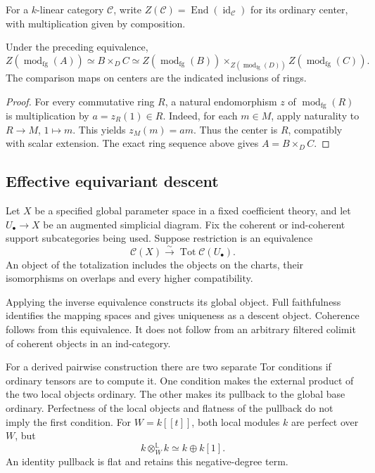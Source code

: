 For a $k$-linear category $\mathcal C$, write
$Z(\mathcal C)=\operatorname{End}(\operatorname{id}_{\mathcal C})$
for its ordinary center, with multiplication given by composition.

\begin{corollary}
\label{v4-arith:ic:w5-h:ordinary-patching-centre}
Under the preceding equivalence,
\[
 Z(\operatorname{mod}_{\mathrm{fg}}(A))
 \simeq B\times_D C
 \simeq Z(\operatorname{mod}_{\mathrm{fg}}(B))
       \times_{Z(\operatorname{mod}_{\mathrm{fg}}(D))}
       Z(\operatorname{mod}_{\mathrm{fg}}(C)).
\]
The comparison maps on centers are the indicated inclusions of rings.
\end{corollary}
\begin{proof}
For every commutative ring $R$, a natural endomorphism $z$ of
$\operatorname{mod}_{\mathrm{fg}}(R)$ is multiplication by
$a=z_R(1)\in R$. Indeed, for each $m\in M$, apply naturality to
$R\to M$, $1\mapsto m$. This yields $z_M(m)=am$.
Thus the center is $R$, compatibly with scalar extension.
The exact ring sequence above gives $A=B\times_D C$.
\end{proof}


\subsection{Effective equivariant descent}

Let \(X\) be a specified global parameter space in a fixed
coefficient theory, and let \(U_\bullet\to X\) be an augmented
simplicial diagram. Fix the coherent or ind-coherent support
subcategories being used. Suppose restriction is an equivalence
\[
 \mathcal C(X)\xrightarrow{\sim}
       \operatorname{Tot}\mathcal C(U_\bullet).
\]
An object of the totalization includes the objects on the charts,
their isomorphisms on overlaps and every higher compatibility.

Applying the inverse equivalence constructs its global object.
Full faithfulness identifies the mapping spaces and gives uniqueness
as a descent object. Coherence follows from this equivalence.
It does not follow from an arbitrary filtered colimit of coherent
objects in an ind-category.

For a derived pairwise construction there are two separate
Tor conditions if ordinary tensors are to compute it.
One condition makes the external product of the two local objects
ordinary. The other makes its pullback to the global base ordinary.
Perfectness of the local objects and flatness of the pullback
do not imply the first condition.
For \(W=k[[t]]\), both local modules \(k\) are perfect over \(W\),
but
\[
 k\otimes_W^{\mathbb L}k\simeq k\oplus k[1].
\]
An identity pullback is flat and retains this negative-degree term.

